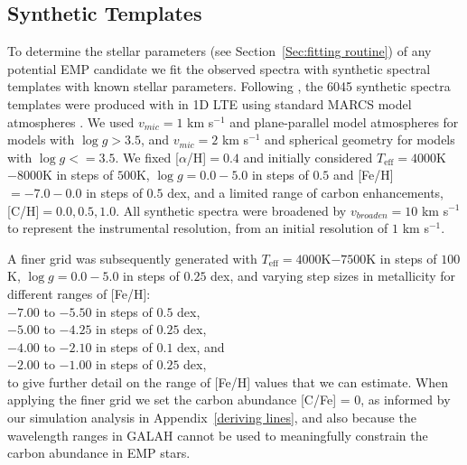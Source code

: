 \documentclass[]{aastex631}
\newcommand{\emps}{EMP stars\xspace}
\newcommand{\logg}{\ensuremath{\log g}\xspace}
\newcommand{\teff}{\ensuremath{T_{\mathrm{eff}}}\xspace}
\newcommand{\feh}{[Fe/H]\xspace}
\begin{document}
\subsection{Synthetic Templates}\label{sec:synths}

To determine the stellar parameters (see Section~\ref{Sec:fitting routine}) of any potential EMP candidate we fit the observed spectra with synthetic spectral templates with known stellar parameters.
Following \citet{nordlander_lowest_2019}, the 6045 synthetic spectra templates were produced with \citet{plez_turbospectrum_2012} in 1D LTE using standard MARCS model atmospheres \citep{gustafsson_grid_2008}. We used $v_{mic}=1$ km s$^{-1}$ and plane-parallel model atmospheres for models with \logg $>3.5$, and $v_{mic}=2$ km s$^{-1}$ and spherical geometry for models with \logg $<=3.5$. We fixed [$\alpha$/H]$=0.4$ and initially considered  
\teff $= 4000$K$ - 8000$K in steps of $500$K,   \logg $= 0.0 - 5.0$ in steps of $0.5$  and [Fe/H] $= -7.0 - 0.0$ in steps of $0.5$ dex, and a limited range of carbon enhancements, [C/H]$=0.0, 0.5, 1.0$. All synthetic spectra were broadened by $v_{broaden}=10$ km s$^{-1}$ to represent the instrumental resolution, from an initial resolution of $1$ km s$^{-1}$.

A finer grid was subsequently generated with \teff $= 4000$K$ - 7500$K in steps of $100$K, \logg $= 0.0 - 5.0$ in steps of $0.25$ dex, and varying step sizes in metallicity for different ranges of  \feh:\\
$-7.00$ to $-5.50$ in steps of $0.5$ dex,\\
$-5.00$ to $-4.25$ in steps of $0.25$ dex,\\
$-4.00$ to $-2.10$ in steps of $0.1$ dex, and \\
$-2.00$ to $-1.00$ in steps of $0.25$ dex, \\ to give further detail on the range of [Fe/H] values that we can estimate. When applying the finer grid we set the carbon abundance [C/Fe] = 0, as informed by our simulation analysis in Appendix~\ref{deriving lines}, and also because the wavelength ranges in GALAH cannot be used to meaningfully constrain the carbon abundance in \emps.
\end{document}
